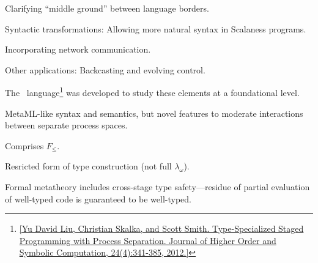 
\begin{citemize}
\item Clarifying ``middle ground'' between language borders.
\item Syntactic transformations: Allowing more natural syntax in Scalaness programs.
\item Incorporating network communication. 
\item Other applications: Backcasting and evolving control.
\end{citemize}
\stopslide


\makeatletter
{}
\makeatother
\stopslide


 The \fml\ language\footnote{\cref{Yu David Liu, Christian Skalka,
    and Scott Smith. Type-Specialized Staged Programming with Process Separation. Journal of
    Higher Order and Symbolic Computation, 24(4):341-385, 2012.}} was developed to study these
elements at a foundational level.
\begin{citemize}
\item MetaML-like syntax and semantics, but novel features to moderate interactions between
  separate process spaces.
\item Comprises $F_{\le}$.
\item Resricted form of type construction (not full $\lambda_\omega$).
\item Formal metatheory includes cross-stage type safety---residue of partial evaluation of
  well-typed code is guaranteed to be well-typed.
\end{citemize}
\stopslide


